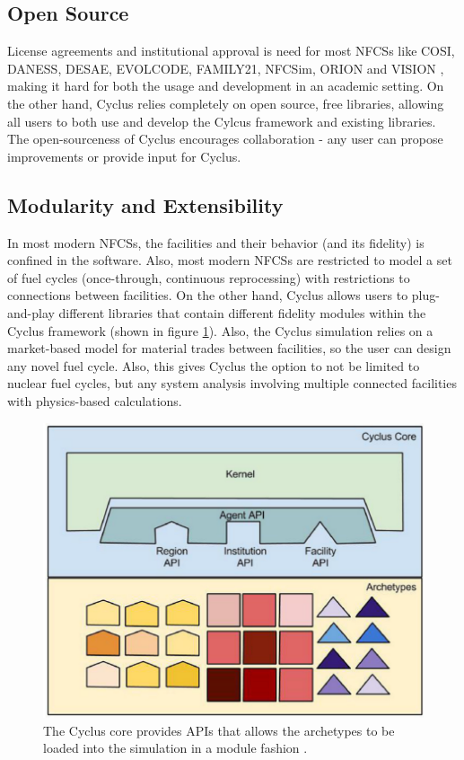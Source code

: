\subsection{Open Source}
License agreements and institutional
approval is need for most \glspl{NFCS} like COSI, DANESS, DESAE, EVOLCODE,
FAMILY21, NFCSim, ORION and VISION \cite{juchau_modeling_2017}, making
it hard for both the usage and development in an academic setting.
On the other hand, Cyclus relies completely on open source,
free libraries, allowing all users to both use and develop the
Cylcus framework and existing libraries. The open-sourceness
of Cyclus encourages collaboration - any user can propose
improvements or provide input for Cyclus.

\subsection{Modularity and Extensibility}
In most modern \glspl{NFCS}, the facilities and their
behavior (and its fidelity) is confined in the software.
Also, most modern \glspl{NFCS} are restricted to model
a set of fuel cycles (once-through, continuous reprocessing)
with restrictions to connections between facilities. On the
other hand, Cyclus allows users to plug-and-play different libraries
that contain different fidelity modules within the Cyclus framework
(shown in figure \ref{fig:core}).
Also, the Cyclus simulation relies on a market-based model
for material trades between facilities, so the user can design
any novel fuel cycle. Also, this gives Cyclus the option to not
be limited to nuclear fuel cycles, but any system analysis
involving multiple connected facilities with physics-based
calculations.


\begin{figure}[htbp!]
	\begin{center}
		\includegraphics[scale=0.2]{./images/cyclus_core.png}
	\end{center}
	\caption{The Cyclus core provides APIs that allows the archetypes
			to be loaded into the simulation in a module fashion
			\cite{huff_fundamental_2016}.}
	\label{fig:core}
\end{figure}

